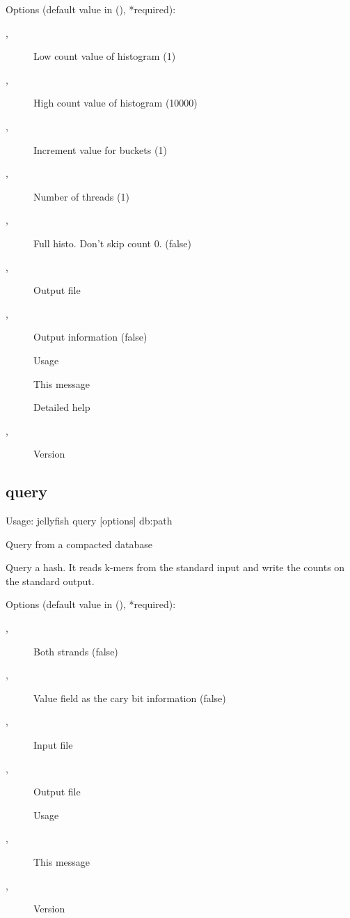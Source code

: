 \noindent Options (default value in (), *required):
\begin{description}
\item[,] \noindent Low count value of histogram (1)
\item[,] \noindent High count value of histogram (10000)
\item[,] \noindent Increment value for buckets (1)
\item[,] \noindent Number of threads (1)
\item[,] \noindent Full histo. Don't skip count 0. (false)
\item[,] \noindent Output file
\item[,] \noindent Output information (false)
\item[] \noindent Usage
\item[] \noindent This message
\item[] \noindent Detailed help
\item[,] \noindent Version
\end{description}
\subsection{query}
\noindent Usage: jellyfish query [options] db:path

\noindent Query from a compacted database

\noindent Query a hash. It reads k-mers from the standard input and write the counts on the standard output.

\noindent Options (default value in (), *required):
\begin{description}
\item[,] \noindent Both strands (false)
\item[,] \noindent Value field as the cary bit information (false)
\item[,] \noindent Input file
\item[,] \noindent Output file
\item[] \noindent Usage
\item[,] \noindent This message
\item[,] \noindent Version
\end{description}
